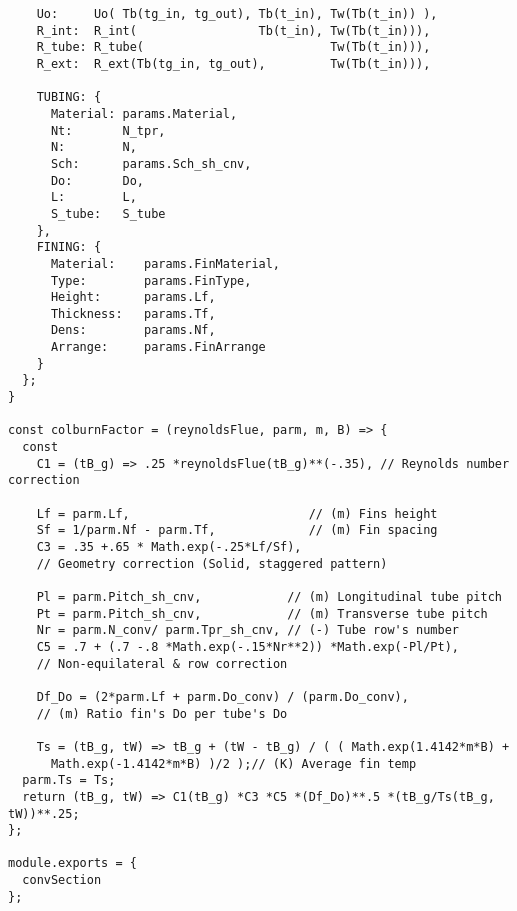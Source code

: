 \begin{verbatim}
    Uo:     Uo( Tb(tg_in, tg_out), Tb(t_in), Tw(Tb(t_in)) ),
    R_int:  R_int(                 Tb(t_in), Tw(Tb(t_in))),
    R_tube: R_tube(                          Tw(Tb(t_in))),
    R_ext:  R_ext(Tb(tg_in, tg_out),         Tw(Tb(t_in))),

    TUBING: {
      Material: params.Material,
      Nt:       N_tpr,
      N:        N,
      Sch:      params.Sch_sh_cnv,
      Do:       Do,
      L:        L,
      S_tube:   S_tube
    },
    FINING: {
      Material:    params.FinMaterial,
      Type:        params.FinType,
      Height:      params.Lf,
      Thickness:   params.Tf,
      Dens:        params.Nf,
      Arrange:     params.FinArrange
    }
  };
}

const colburnFactor = (reynoldsFlue, parm, m, B) => {
  const
    C1 = (tB_g) => .25 *reynoldsFlue(tB_g)**(-.35), // Reynolds number correction

    Lf = parm.Lf,                         // (m) Fins height
    Sf = 1/parm.Nf - parm.Tf,             // (m) Fin spacing
    C3 = .35 +.65 * Math.exp(-.25*Lf/Sf), 
    // Geometry correction (Solid, staggered pattern)

    Pl = parm.Pitch_sh_cnv,            // (m) Longitudinal tube pitch
    Pt = parm.Pitch_sh_cnv,            // (m) Transverse tube pitch
    Nr = parm.N_conv/ parm.Tpr_sh_cnv, // (-) Tube row's number
    C5 = .7 + (.7 -.8 *Math.exp(-.15*Nr**2)) *Math.exp(-Pl/Pt), 
    // Non-equilateral & row correction

    Df_Do = (2*parm.Lf + parm.Do_conv) / (parm.Do_conv), 
    // (m) Ratio fin's Do per tube's Do

    Ts = (tB_g, tW) => tB_g + (tW - tB_g) / ( ( Math.exp(1.4142*m*B) + 
      Math.exp(-1.4142*m*B) )/2 );// (K) Average fin temp
  parm.Ts = Ts;
  return (tB_g, tW) => C1(tB_g) *C3 *C5 *(Df_Do)**.5 *(tB_g/Ts(tB_g, tW))**.25;
};

module.exports = {
  convSection
};
\end{verbatim}

